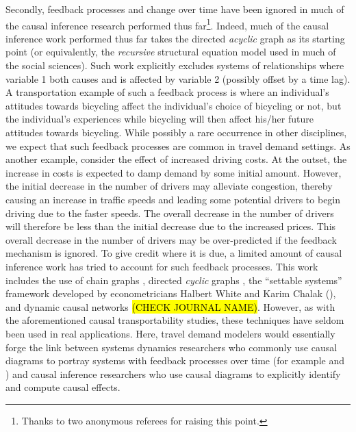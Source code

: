 Secondly, feedback processes and change over time have been ignored in much of the causal inference research performed thus far\footnote{Thanks to two anonymous referees for raising this point.}. Indeed, much of the causal inference work performed thus far takes the directed \textit{acyclic} graph as its starting point (or equivalently, the \textit{recursive} structural equation model used in much of the social sciences). Such work explicitly excludes systems of relationships where variable 1 both causes and is affected by variable 2 (possibly offset by a time lag). A transportation example of such a feedback process is where an individual's attitudes towards bicycling affect the individual's choice of bicycling or not, but the individual's experiences while bicycling will then affect his/her future attitudes towards bicycling. While possibly a rare occurrence in other disciplines, we expect that such feedback processes are common in travel demand settings. As another example, consider the effect of increased driving costs. At the outset, the increase in costs is expected to damp demand by some initial amount. However, the initial decrease in the number of drivers may alleviate congestion, thereby causing an increase in traffic speeds and leading some potential drivers to begin driving due to the faster speeds. The overall decrease in the number of drivers will therefore be less than the initial decrease due to the increased prices. This overall decrease in the number of drivers may be over-predicted if the feedback mechanism is ignored. To give credit where it is due, a limited amount of causal inference work has tried to account for such feedback processes. This work includes the use of chain graphs \citep{lauritzen_2002_chain}, directed \textit{cyclic} graphs \citep{schmidt_2009_modeling}, the ``settable systems'' framework developed by econometricians Halbert White and Karim Chalak (\citeyear{white_2009_settable}), and dynamic causal networks \citep{blondel_2017_identifiability} \hl{(CHECK JOURNAL NAME)}. However, as with the aforementioned causal transportability studies, these techniques have seldom been used in real applications. Here, travel demand modelers would essentially forge the link between systems dynamics researchers who commonly use causal diagrams to portray systems with feedback processes over time (for example \citet{abbas_1994_system} and \citet{shepherd_2014_review}) and causal inference researchers who use causal diagrams to explicitly identify and compute causal effects.

